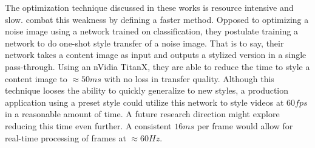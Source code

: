 \documentclass{article}
\begin{document}
The optimization technique discussed in these works is resource intensive
and slow. \cite{2016arXiv160308155J} combat this weakness by defining a faster
method. Opposed to optimizing a noise image using a network trained on
classification, they postulate training a network to do one-shot style
transfer of a noise image. That is to say, their network takes a content image
as input and outputs a stylized version in a single pass-through. Using an
nVidia TitanX, they are able to reduce the time to style a content image to
$\approx 50ms$ with no loss in transfer quality. Although this technique
looses the ability to quickly generalize to new styles, a production
application using a preset style could utilize this network to style videos at
$60fps$ in a reasonable amount of time. A future research direction might
explore reducing this time even further. A consistent $16ms$ per frame would
allow for real-time processing of frames at $\approx 60Hz$.







\end{document}

